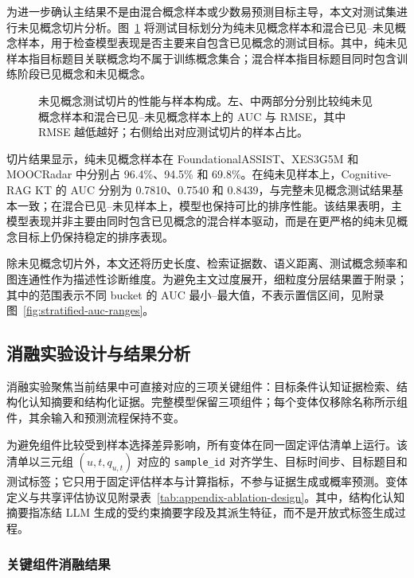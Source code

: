 \documentclass[UTF8,a4paper,12pt]{ctexart}
\numberwithin{table}{section}
\begin{document}
为进一步确认主结果不是由混合概念样本或少数易预测目标主导，本文对测试集进行未见概念切片分析。图~\ref{fig:unseen-slice-results} 将测试目标划分为纯未见概念样本和混合已见--未见概念样本，用于检查模型表现是否主要来自包含已见概念的测试目标。其中，纯未见样本指目标题目关联概念均不属于训练概念集合；混合样本指目标题目同时包含训练阶段已见概念和未见概念。

\begin{figure}[H]
\centering

\caption{未见概念测试切片的性能与样本构成。左、中两部分分别比较纯未见概念样本和混合已见--未见概念样本上的 AUC 与 RMSE，其中 RMSE 越低越好；右侧给出对应测试切片的样本占比。}
\label{fig:unseen-slice-results}
\end{figure}

切片结果显示，纯未见概念样本在 FoundationalASSIST、XES3G5M 和 MOOCRadar 中分别占 96.4\%、94.5\% 和 69.8\%。在纯未见样本上，Cognitive-RAG KT 的 AUC 分别为 0.7810、0.7540 和 0.8439，与完整未见概念测试结果基本一致；在混合已见--未见样本上，模型也保持可比的排序性能。该结果表明，主模型表现并非主要由同时包含已见概念的混合样本驱动，而是在更严格的纯未见概念目标上仍保持稳定的排序表现。

除未见概念切片外，本文还将历史长度、检索证据数、语义距离、测试概念频率和图连通性作为描述性诊断维度。为避免主文过度展开，细粒度分层结果置于附录；其中的范围表示不同 bucket 的 AUC 最小--最大值，不表示置信区间，见附录图~\ref{fig:stratified-auc-ranges}。


\subsection{消融实验设计与结果分析}

消融实验聚焦当前结果中可直接对应的三项关键组件：目标条件认知证据检索、结构化认知摘要和结构化证据。完整模型保留三项组件；每个变体仅移除名称所示组件，其余输入和预测流程保持不变。

为避免组件比较受到样本选择差异影响，所有变体在同一固定评估清单上运行。该清单以三元组 \((u,t,q_{u,t})\) 对应的 \texttt{sample\_id} 对齐学生、目标时间步、目标题目和测试标签；它只用于固定评估样本与计算指标，不参与证据生成或概率预测。变体定义与共享评估协议见附录表~\ref{tab:appendix-ablation-design}。其中，结构化认知摘要指冻结 LLM 生成的受约束摘要字段及其派生特征，而不是开放式标签生成过程。

\subsubsection{关键组件消融结果}
\end{document}

